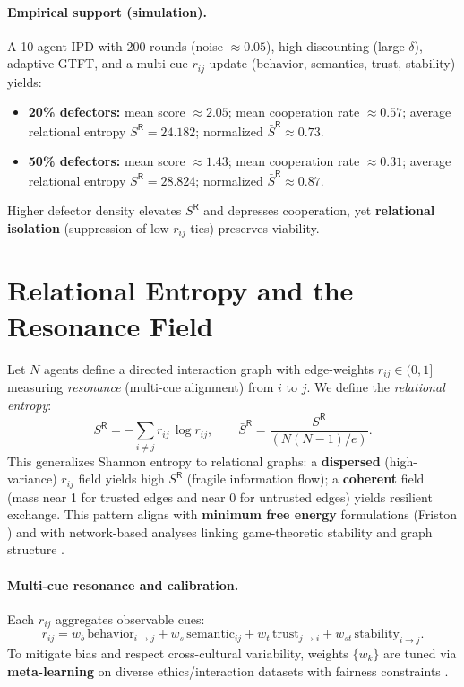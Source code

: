 \documentclass[11pt,a4paper]{article}
\begin{document}
\paragraph{Empirical support (simulation).}
A 10-agent IPD with 200 rounds (noise $\approx 0.05$), high discounting (large $\delta$), adaptive GTFT, and a multi-cue $r_{ij}$ update (behavior, semantics, trust, stability) yields:
\begin{itemize}
  \item \textbf{20\% defectors:} mean score $\approx 2.05$; mean cooperation rate $\approx 0.57$; average relational entropy $S^{\mathsf{R}}=\mathbf{24.182}$; normalized $\bar S^{\mathsf{R}}\approx\mathbf{0.73}$.
  \item \textbf{50\% defectors:} mean score $\approx 1.43$; mean cooperation rate $\approx 0.31$; average relational entropy $S^{\mathsf{R}}=\mathbf{28.824}$; normalized $\bar S^{\mathsf{R}}\approx\mathbf{0.87}$.
\end{itemize}
Higher defector density elevates $S^{\mathsf{R}}$ and depresses cooperation, yet \textbf{relational isolation} (suppression of low-$r_{ij}$ ties) preserves viability.

\section{Relational Entropy and the Resonance Field}
Let $N$ agents define a directed interaction graph with edge-weights $r_{ij}\in(0,1]$ measuring \emph{resonance} (multi-cue alignment) from $i$ to $j$. We define the \emph{relational entropy}:
\begin{equation}
S^{\mathsf{R}} = - \sum_{i\neq j} r_{ij}\,\log r_{ij}, \qquad 
\bar S^{\mathsf{R}}=\frac{S^{\mathsf{R}}}{(N(N-1)/e)}.
\end{equation}
This generalizes Shannon entropy to relational graphs: a \textbf{dispersed} (high-variance) $r_{ij}$ field yields high $S^{\mathsf{R}}$ (fragile information flow); a \textbf{coherent} field (mass near 1 for trusted edges and near 0 for untrusted edges) yields resilient exchange. This pattern aligns with \textbf{minimum free energy} formulations (Friston \cite{Friston2010}) and with network-based analyses linking game-theoretic stability and graph structure \cite{HauertSzabo2005}.

\paragraph{Multi-cue resonance and calibration.}
Each $r_{ij}$ aggregates observable cues:
\[
r_{ij}= w_b\,\text{behavior}_{i\to j} + w_s\,\text{semantic}_{ij} + w_t\,\text{trust}_{j\to i} + w_{st}\,\text{stability}_{i\to j}.
\]
To mitigate bias and respect cross-cultural variability, weights $\{w_k\}$ are tuned via \textbf{meta-learning} on diverse ethics/interaction datasets with fairness constraints \cite{Floridi2020,Russell2019}.
\end{document}
